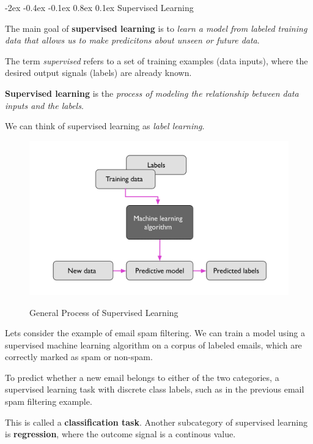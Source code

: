 \documentclass[12pt]{report}
\makeatletter
\renewcommand{\subsection}{\@startsection{subsection}{2}{\z@}%
  {-2ex \@plus -0.4ex \@minus -0.1ex}%
  {0.8ex \@plus 0.1ex}%
  {\normalfont\large\subsectionstyle}}
\newcommand{\subsectionstyle}[1]{%
  \par\noindent\hrule
  \vspace{-0.4ex}%
  {\scshape #1\par}%
  \vspace{0.4ex}%
  \hrule
}
\theoremstyle{largebreak}
\makeatother
\begin{document}
    \subsection{Supervised Learning}

    The main goal of \textbf{supervised learning} is to \textit{learn a model from labeled training data that allows us to make predicitons about unseen or future data}.

    The term \textit{supervised} refers to a set of training examples (data inputs), where the desired output signals (labels) are already known.

    \begin{mydef}
        \textbf{Supervised learning} is the \textit{process of modeling the relationship between data inputs and the labels}.
    \end{mydef}

    We can think of supervised learning as \textit{label learning}.

    \begin{figure}[h]
        \begin{minipage}{\textwidth}
            \centering
            \includegraphics[scale=1]{images/supervised_learning_process.png} \\
            \caption{General Process of Supervised Learning}
            \label{figure:general_process_supervised_learning}
        \end{minipage}
    \end{figure}

    \begin{exa}
        Lets consider the example of email spam filtering. We can train a model using a supervised machine learning algorithm on a corpus of labeled emails, which are correctly marked as spam or non-spam.

        To predict whether a new email belongs to either of the two categories, a supervised learning task with discrete class labels, such as in the previous email spam filtering example.
        
        This is called a \textbf{classification task}. Another subcategory of supervised learning is \textbf{regression}, where the outcome signal is a continous value.
    \end{exa}
\end{document}
